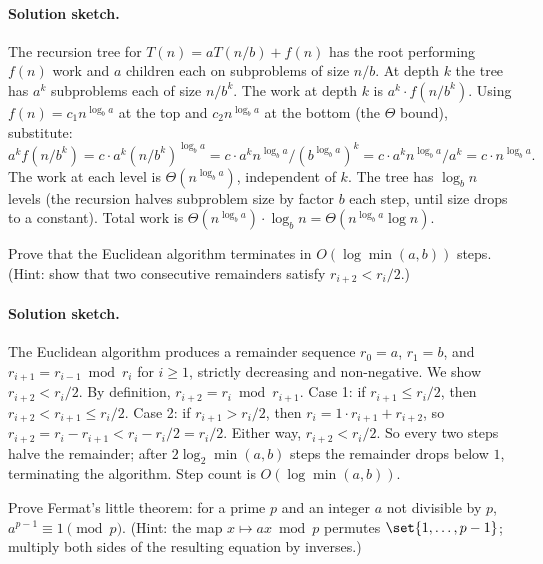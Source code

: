 \paragraph{Solution sketch.}
The recursion tree for $T(n) = a T(n/b) + f(n)$ has the root
performing $f(n)$ work and $a$ children each on subproblems of
size $n/b$. At depth $k$ the tree has $a^{k}$ subproblems each of
size $n / b^{k}$. The work at depth $k$ is $a^{k} \cdot f(n /
b^{k})$. Using $f(n) = c_{1} n^{\log_{b} a}$ at the top and
$c_{2} n^{\log_{b} a}$ at the bottom (the $\Theta$ bound),
substitute:
\[
a^{k} f(n / b^{k}) = c \cdot a^{k} (n / b^{k})^{\log_{b} a}
= c \cdot a^{k} n^{\log_{b} a} / (b^{\log_{b} a})^{k}
= c \cdot a^{k} n^{\log_{b} a} / a^{k}
= c \cdot n^{\log_{b} a}.
\]
The work at each level is $\Theta(n^{\log_{b} a})$, independent
of $k$. The tree has $\log_{b} n$ levels (the recursion halves
subproblem size by factor $b$ each step, until size drops to a
constant). Total work is $\Theta(n^{\log_{b} a}) \cdot \log_{b} n
= \Theta(n^{\log_{b} a} \log n)$.

\begin{exercise}
Prove that the Euclidean algorithm terminates in $O(\log \min(a,
b))$ steps. (Hint: show that two consecutive remainders satisfy
$r_{i+2} < r_{i} / 2$.)
\end{exercise}

\paragraph{Solution sketch.}
The Euclidean algorithm produces a remainder sequence $r_{0} = a$,
$r_{1} = b$, and $r_{i+1} = r_{i-1} \bmod r_{i}$ for $i \geq 1$,
strictly decreasing and non-negative. We show $r_{i+2} <
r_{i} / 2$. By definition, $r_{i+2} = r_{i} \bmod r_{i+1}$. Case 1:
if $r_{i+1} \leq r_{i} / 2$, then $r_{i+2} < r_{i+1} \leq r_{i} /
2$. Case 2: if $r_{i+1} > r_{i} / 2$, then $r_{i} = 1 \cdot
r_{i+1} + r_{i+2}$, so $r_{i+2} = r_{i} - r_{i+1} < r_{i} - r_{i} /
2 = r_{i} / 2$. Either way, $r_{i+2} < r_{i} / 2$. So every two
steps halve the remainder; after $2 \log_{2} \min(a, b)$ steps the
remainder drops below $1$, terminating the algorithm. Step count
is $O(\log \min(a, b))$.

\begin{exercise}
Prove Fermat's little theorem: for a prime $p$ and an integer $a$
not divisible by $p$, $a^{p-1} \equiv 1 \pmod{p}$. (Hint: the map
$x \mapsto a x \bmod p$ permutes $\set{1, \ldots, p-1}$; multiply
both sides of the resulting equation by inverses.)
\end{exercise}


